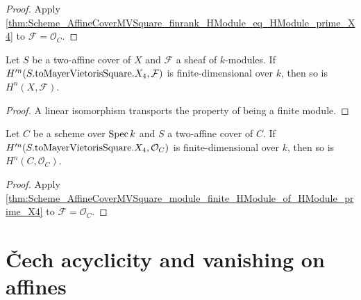 \begin{proof}


\leanok
  Apply \cref{thm:Scheme_AffineCoverMVSquare_finrank_HModule_eq_HModule_prime_X4} to \(\mathcal F=\mathcal O_C\).
\end{proof}

\begin{theorem}\leanok
  \label{thm:Scheme_AffineCoverMVSquare_module_finite_HModule_of_HModule_prime_X4}

  Let \(S\) be a two-affine cover of \(X\) and \(\mathcal F\) a sheaf of \(k\)-modules. If \(H^{\prime n}(S.\mathrm{toMayerVietorisSquare}.X_4, \mathcal F)\) is finite-dimensional over \(k\), then so is \(H^{n}(X, \mathcal F)\).
\end{theorem}

\begin{proof}


\leanok
  A linear isomorphism transports the property of being a finite module.
\end{proof}

\begin{theorem}\leanok
  \label{thm:Scheme_AffineCoverMVSquare_module_finite_HModule_of_HModule_prime_X4_curve}

  Let \(C\) be a scheme over \(\operatorname{Spec} k\) and \(S\) a two-affine cover of \(C\). If \(H^{\prime n}(S.\mathrm{toMayerVietorisSquare}.X_4, \mathcal O_C)\) is finite-dimensional over \(k\), then so is \(H^{n}(C, \mathcal O_C)\).
\end{theorem}

\begin{proof}


\leanok
  Apply \cref{thm:Scheme_AffineCoverMVSquare_module_finite_HModule_of_HModule_prime_X4} to \(\mathcal F=\mathcal O_C\).
\end{proof}

\section{\v{C}ech acyclicity and vanishing on affines}
\label{sec:cech_acyclicity}

